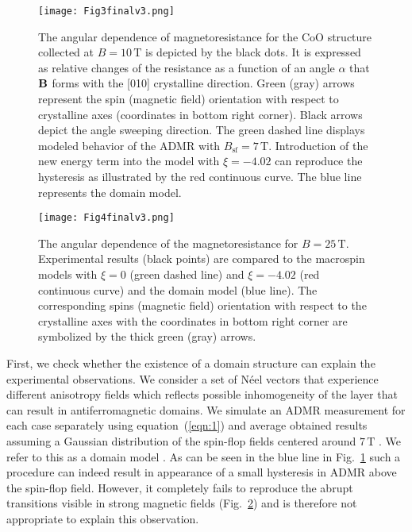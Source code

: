 \documentclass[%
 aps,
prl,
superscriptaddress,
 amsmath,amssymb,
reprint,%
]{revtex4-2}
\begin{document}
\begin{figure}
\texttt{[image: Fig3finalv3.png]}
\caption{\label{fig:10T} The angular dependence of magnetoresistance for the CoO structure collected at $B=10\,\text{T}$ is depicted by the black dots. It is expressed as relative changes of the resistance as a function of an angle $\alpha$ that $\bf{B}$ forms with the [010] crystalline direction. Green (gray) arrows represent the spin (magnetic field) orientation with respect to crystalline axes (coordinates in bottom right corner). Black arrows depict the angle sweeping direction. The green dashed line displays modeled behavior of the ADMR with $B_\text{sf}=7\,\text{T}$. Introduction of the new energy term into the model with $\xi=-4.02$ can reproduce the hysteresis as illustrated by the red continuous curve. The blue line represents the domain model.}
\end{figure}

\begin{figure}
\texttt{[image: Fig4finalv3.png]}
\caption{\label{fig:25T} The angular dependence of the magnetoresistance for $B=25\,\text{T}$. Experimental results (black points) are compared to the macrospin models with $\xi=0$ (green dashed line) and $\xi=-4.02$ (red continuous curve) and the domain model (blue line). The corresponding spins (magnetic field) orientation with respect to the crystalline axes with the coordinates in bottom right corner are symbolized by the thick green (gray) arrows.}
\end{figure}

First, we check whether the existence of a domain structure can explain the experimental observations. We consider a set of N\'eel vectors that experience different anisotropy fields which reflects possible inhomogeneity of the layer that can result in antiferromagnetic domains. We simulate an ADMR measurement for each case separately using equation~(\ref{eqn:1}) and average obtained results assuming a Gaussian distribution of the spin-flop fields centered around $7\,\text{T}$ \cite{supplement}. We refer to this as a domain model \cite{supplement}. As can be seen in the blue line in Fig.~\ref{fig:10T} such a procedure can indeed result in appearance of a small hysteresis in ADMR above the spin-flop field. However, it completely fails to reproduce the abrupt transitions visible in strong magnetic fields (Fig.~\ref{fig:25T}) and is therefore not appropriate to explain this observation. 
\end{document}
